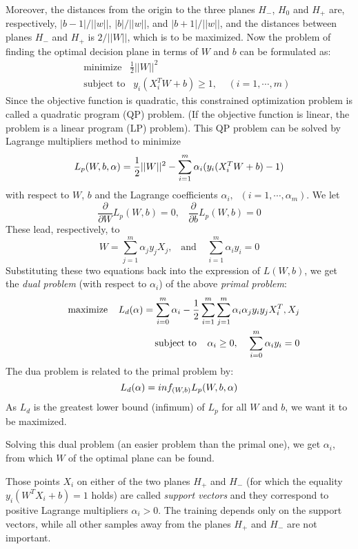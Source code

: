 Moreover, the distances from the origin to the three planes $H_-$, $H_0$ 
and $H_+$ are, respectively, $|b-1|/||w||$, $|b|/||w||$, and $|b+1|/||w||$, 
and the distances between planes $H_-$ and $H_+$ is $2/||W||$, which is to
be maximized. Now the problem of finding the optimal decision plane in terms 
of $W$ and $b$ can be formulated as:
\begin{eqnarray}
&&	\mbox{minimize}\;\;\;\frac{1}{2}||W||^2	\nonumber \\
&&	\mbox{subject to}\;\;\;y_i (X_i^T W+b) \ge 1,\;\;\;\;(i=1,\cdots,m)
	\nonumber
\end{eqnarray}
Since the objective function is quadratic, this constrained optimization
problem is called a quadratic program (QP) problem.
(If the objective function is linear, the problem is a linear program (LP)
problem). This QP problem can be solved by Lagrange multipliers method to
minimize 
\[
L_p(W,b,{\bf \alpha})=\frac{1}{2}||W||^2-\sum_{i=1}^m \alpha_i(y_i(X_i^TW+b)-1)
\]
with respect to $W$, $b$ and the Lagrange coefficients $\alpha_i,\;\;(i=1,
\cdots,\alpha_m)$.  We let
\[ 	\frac{\partial}{\partial W}L_p(W,b)=0,\;\;\;
	\frac{\partial}{\partial b}L_p(W,b)=0	\]
These lead, respectively, to
\[	W=\sum_{j=1}^m \alpha_j y_j X_j,\;\;\;\mbox{and}\;\;\;\;
	\sum_{i=1}^m \alpha_i y_i=0	\]
Substituting these two equations back into the expression of $L(W,b)$,
we get the {\em dual problem} (with respect to $\alpha_i$) of the above 
{\em primal problem}:
\begin{eqnarray}
&& 	\mbox{maximize}\;\;\;\;L_d({\bf \alpha})=
	\sum_{i=0}^m\alpha_i -\frac{1}{2}
	\sum_{i=1}^m \sum_{j=1}^m \alpha_i \alpha_j y_i y_j X_i^T,X_j
	\nonumber \\
&&	\mbox{subject to}\;\;\;\;\alpha_i\ge 0,\;\;\;\;
	\sum_{i=0}^m \alpha_i y_i=0	
	\nonumber
\end{eqnarray}
The dua problem is related to the primal problem by:
\[	L_d({\bf \alpha})=inf_{(W,b)} L_p(W,b,{\bf \alpha})	\]
As $L_d$ is the greatest lower bound (infimum) of $L_p$ for all $W$ and $b$,
we want it to be maximized. 

Solving this dual problem (an easier problem than the primal one), we get
$\alpha_i$, from which $W$ of the optimal plane can be found. 

Those points $X_i$ on either of the two planes $H_+$ and $H_-$ (for which 
the equality $y_i(W^T X_i+b)=1$ holds) are called {\em support vectors}
and they correspond to positive Lagrange multipliers $\alpha_i>0$. The 
training depends only on the support vectors, while all other samples away 
from the planes $H_+$ and $H_-$ are not important.

